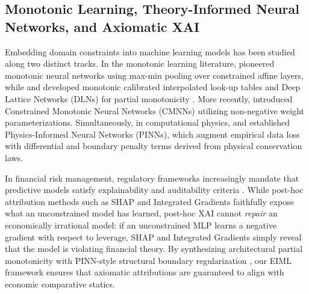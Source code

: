 \documentclass[11pt,a4paper]{article}
\begin{document}
\subsection{Monotonic Learning, Theory-Informed Neural Networks, and Axiomatic XAI}
Embedding domain constraints into machine learning models has been studied along two distinct tracks. In the monotonic learning literature, \citet{sill1997monotonic} pioneered monotonic neural networks using max-min pooling over constrained affine layers, while \citet{gupta2016monotonic} and \citet{you2017deep} developed monotonic calibrated interpolated look-up tables and Deep Lattice Networks (DLNs) for partial monotonicity \citep{cano2019monotonic}. More recently, \citet{runje2023constrained} introduced Constrained Monotonic Neural Networks (CMNNs) utilizing non-negative weight parameterizations. Simultaneously, in computational physics, \citet{raissi2019physics} and \citet{karniadakis2021physics} established Physics-Informed Neural Networks (PINNs), which augment empirical data loss with differential and boundary penalty terms derived from physical conservation laws.

In financial risk management, regulatory frameworks increasingly mandate that predictive models satisfy explainability and auditability criteria \citep{bussmann2021explainable,bucker2022transparency}. While post-hoc attribution methods such as SHAP \citep{lundberg2017unified} and Integrated Gradients \citep{sundararajan2017axiomatic} faithfully expose what an unconstrained model has learned, post-hoc XAI cannot \textit{repair} an economically irrational model: if an unconstrained MLP learns a negative gradient with respect to leverage, SHAP and Integrated Gradients simply reveal that the model is violating financial theory. By synthesizing architectural partial monotonicity \citep{sill1997monotonic,runje2023constrained} with PINN-style structural boundary regularization \citep{raissi2019physics}, our EIML framework ensures that axiomatic attributions are guaranteed to align with economic comparative statics.
\end{document}
